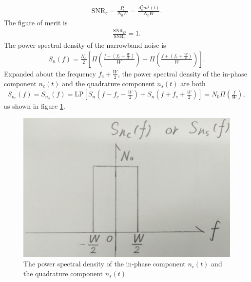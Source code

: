 \documentclass{assignment}
\begin{document}
\begin{sol}
\begin{align}
        \text{SNR}_c=\frac{P_t}{N_0W}=\frac{A_c^2\overline{m^2(t)}}{N_0W}.
    \end{align}
    The figure of merit is
    \begin{align}
        \frac{\text{SNR}_D}{\text{SNR}_c}=1.
    \end{align}
    The power spectral density of the narrowband noise is
    \begin{align}
        S_n(f)=\frac{N_0}{2}\left[\Pi\left(\frac{f-\left(f_c+\frac{W}{2}\right)}{W}\right)+\Pi\left(\frac{f+\left(f_c+\frac{W}{2}\right)}{W}\right)\right].
    \end{align}
    Expanded about the frequency $f_c+\frac{W}{2}$, the power spectral density of the in-phase component $n_c(t)$ and the quadrature component $n_s(t)$ are both
    \begin{align}
        S_{n_c}(f)=S_{n_s}(f)=\text{LP}\left[S_n\left(f-f_c-\frac{W}{2}\right)+S_n\left(f+f_c+\frac{W}{2}\right)\right]=N_0\Pi\left(\frac{f}{W}\right),
    \end{align}
    as shown in figure \ref{P-6-A-2}.
    \begin{figure}[h]
        \centering
        \includegraphics[width=.4\columnwidth]{A-6-P-2.jpg}
        \caption{The power spectral density of the in-phase component $n_c(t)$ and the quadrature component $n_s(t)$}
        \label{P-6-A-2}
    \end{figure}
\end{sol}
\end{document}
